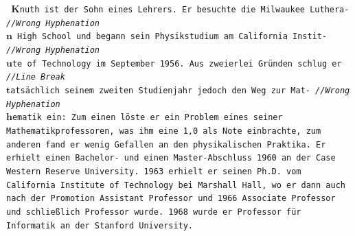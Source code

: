 \documentclass{beamer}
\begin{document}
\begin{frame}
\texttt{\tiny
$\boldsymbol{K}$nuth ist der Sohn eines Lehrers. Er besuchte die Milwaukee Luthera- \hskip 22pt \emph{//Wrong Hyphenation} \\
$\boldsymbol{n}$ High School und begann sein Physikstudium am California Instit- \hskip 35pt \emph{//Wrong Hyphenation} \\
$\boldsymbol{u}$te of Technology im September 1956. Aus zweierlei Gründen schlug er \hskip 22pt \emph{//Line Break} \\
$\boldsymbol{t}$atsächlich seinem zweiten Studienjahr jedoch den Weg zur Mat- \hskip 45pt \emph{//Wrong Hyphenation} \\
$\boldsymbol{h}$ematik ein: Zum einen löste er ein Problem eines seiner \\
Mathematikprofessoren, was ihm eine 1,0 als Note einbrachte, zum \\
anderen fand er wenig Gefallen an den physikalischen Praktika. Er \\
erhielt einen Bachelor- und einen Master-Abschluss 1960 an der Case \\
Western Reserve University. 1963 erhielt er seinen Ph.D. vom \\
California Institute of Technology bei Marshall Hall, wo er dann auch \\
nach der Promotion Assistant Professor und 1966 Associate Professor \\
und schließlich Professor wurde. 1968 wurde er Professor für \\
Informatik an der Stanford University. \\}
\end{frame}
\end{document}
